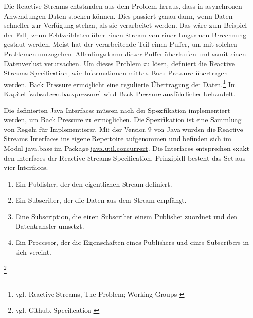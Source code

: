 Die Reactive Streams entstanden aus dem Problem heraus, dass in asynchronen Anwendungen Daten stocken können. Dies passiert genau dann, wenn Daten schneller zur Verfügung stehen, als sie verarbeitet werden. Das wäre zum Beispiel der Fall, wenn Echtzeitdaten über einen Stream von einer langsamen Berechnung gestaut werden. Meist hat der verarbeitende Teil einen Puffer, um mit solchen Problemen umzugehen. Allerdings kann dieser Puffer überlaufen und somit einen Datenverlust verursachen. Um dieses Problem zu lösen, definiert die Reactive Streams Specification, wie Informationen mittels Back Pressure übertragen werden. Back Pressure ermöglicht eine regulierte Übertragung der Daten.\footnote{vgl. Reactive Streams, The Problem; Working Groups \cite{web:site:reative_stream_specification} \label{rss}}
Im Kapitel \ref{subsubsec:backpressure} wird Back Pressure ausführlicher behandelt.

Die definierten Java Interfaces müssen nach der Spezifikation implementiert werden, um Back Pressure zu ermöglichen. Die Spezifikation ist eine Sammlung von Regeln für Implementierer. Mit der Version 9 von Java wurden die Reactive Streams Interfaces ins eigene Repertoire aufgenommen und befinden sich im Modul java.base im Package \href{https://docs.oracle.com/javase/9/docs/api/java/util/concurrent/Flow.html}{java.util.concurrent}. Die Interfaces entsprechen exakt den Interfaces der Reactive Streams Specification. 
\clearpage
Prinzipiell besteht das Set aus vier Interfaces.
\begin{enumerate}
\item Ein Publisher, der den eigentlichen Stream definiert.
\item Ein Subscriber, der die Daten aus dem Stream empfängt.
\item Eine Subscription, die einen Subscriber einem Publisher zuordnet und den Datentransfer umsetzt.
\item Ein Processor, der die Eigenschaften eines Publishers und eines Subscribers in sich vereint.
\end{enumerate} 
\footnote{vgl. Github, Specification \cite{web:github:reactive_streams}}

